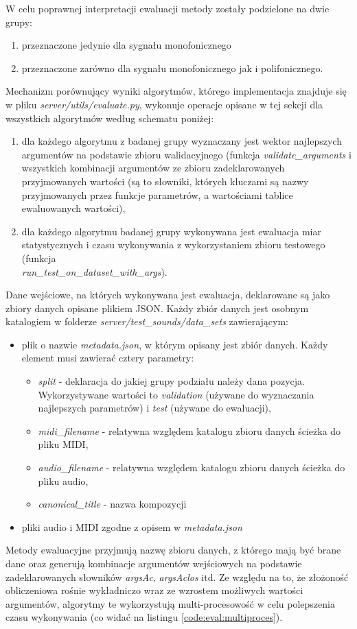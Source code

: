 \documentclass[12pt,a4paper,twoside]{mwart}
\begin{document}
W celu poprawnej interpretacji ewaluacji metody zostały podzielone na dwie grupy:
\begin{enumerate}
  \item przeznaczone jedynie dla sygnału monofonicznego
  \item przeznaczone zarówno dla sygnału monofonicznego jak i polifonicznego.
\end{enumerate}
Mechanizm porównujący wyniki algorytmów, którego implementacja znajduje się w pliku \textit{server/utils/evaluate.py}, wykonuje operacje opisane w tej sekcji dla wszystkich algorytmów według schematu poniżej:
\begin{enumerate}
  \item dla każdego algorytmu z badanej grupy wyznaczany jest wektor najlepszych argumentów na podstawie zbioru walidacyjnego (funkcja \textit{validate\_arguments} i wszystkich kombinacji argumentów ze zbioru zadeklarowanych przyjmowanych wartości (są to słowniki, których kluczami są nazwy przyjmowanych przez funkcje parametrów, a wartościami tablice ewaluowanych wartości),
  \item dla każdego algorytmu badanej grupy wykonywana jest ewaluacja miar statystycznych i czasu wykonywania z wykorzystaniem zbioru testowego (funkcja \\\textit{run\_test\_on\_dataset\_with\_args}).
\end{enumerate}
Dane wejściowe, na których wykonywana jest ewaluacja, deklarowane są jako zbiory danych opisane plikiem JSON. Każdy zbiór danych jest osobnym katalogiem w folderze \textit{server/test\_sounds/data\_sets} zawierającym:
\begin{itemize}
  \item plik o nazwie \textit{metadata.json}, w którym opisany jest zbiór danych. Każdy element musi zawierać cztery parametry:
  \begin{itemize}
    \item \textit{split} - deklaracja do jakiej grupy podziału należy dana pozycja. Wykorzystywane wartości to \textit{validation} (używane do wyznaczania najlepszych parametrów) i \textit{test} (używane do ewaluacji),
    \item \textit{midi\_filename} - relatywna względem katalogu zbioru danych ścieżka do pliku MIDI,
    \item \textit{audio\_filename} - relatywna względem katalogu zbioru danych ścieżka do pliku audio,
    \item \textit{canonical\_title} - nazwa kompozycji
  \end{itemize}
  \item pliki audio i MIDI zgodne z opisem w \textit{metadata.json}
\end{itemize}
Metody ewaluacyjne przyjmują nazwę zbioru danych, z którego mają być brane dane oraz generują kombinacje argumentów wejściowych na podstawie zadeklarowanych słowników \textit{argsAc}, \textit{argsAclos} itd. Ze względu na to, że złożoność obliczeniowa rośnie wykładniczo wraz ze wzrostem możliwych wartości argumentów, algorytmy te wykorzystują multi-procesowość w celu polepszenia czasu wykonywania (co widać na listingu \ref{code:eval:multiproces}). 
\end{document}
